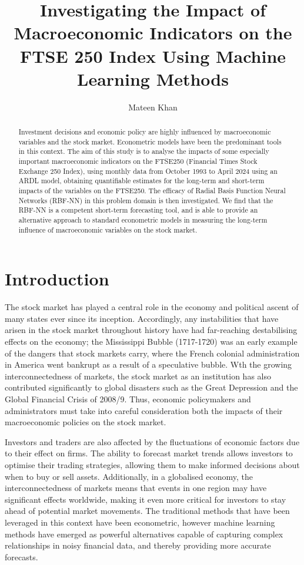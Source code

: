 \documentclass[12pt,a4paper]{article}
\title{Investigating the Impact of Macroeconomic Indicators 
on the FTSE 250 Index Using Machine Learning Methods}
\author{Mateen Khan}
\date{}
\begin{document}
\maketitle

\begin{abstract}
    Investment decisions and economic policy are highly influenced by 
    macroeconomic variables and the stock market. Econometric models
    have been the predominant tools in this context. The aim of this study is to analyse the impacts of some especially important macroeconomic
    indicators on the FTSE250 
    (Financial Times Stock Exchange 250 Index), using monthly data 
    from  October 1993 to April 2024 using an ARDL model, obtaining 
    quantifiable estimates for the long-term and short-term impacts of the variables
    on the FTSE250. The efficacy of Radial Basis Function 
    Neural Networks (RBF-NN) in this problem domain is then investigated. We find that 
    the RBF-NN is a competent short-term forecasting tool, and is able to 
    provide an alternative approach to standard econometric models in measuring the long-term influence of
    macroeconomic variables on the stock market.
\end{abstract}

\section{Introduction}

The stock market has played a central role in the economy and 
political ascent of many states ever since its inception. 
Accordingly, any instabilities that have arisen in the stock market 
throughout history have had far-reaching destabilising effects on the 
economy; the Mississippi Bubble (1717-1720) was an early example of the 
dangers that stock markets carry, where the French colonial administration 
in America went bankrupt as a result of a speculative bubble. Wth the
growing interconnectedness of markets, the stock market as an institution 
has also contributed significantly to global disasters such as the Great 
Depression and the Global Financial Crisis of 2008/9. Thus, economic 
policymakers and administrators must take into careful consideration 
both the impacts of their macroeconomic policies on the stock market.

Investors and traders are also affected by the 
fluctuations of economic factors due to their effect on firms.
The ability to forecast market trends allows 
investors to optimise their trading strategies, allowing them to make
informed decisions about when to buy or sell assets. 
Additionally, in a globalised economy, the interconnectedness of 
markets means that events in one region may have significant effects worldwide, 
making it even more critical for investors to stay ahead of potential market movements.
The traditional methods that have been leveraged in this context have been econometric, 
however machine learning methods have emerged as powerful alternatives capable
of capturing complex relationships in noisy financial data, and thereby providing more
accurate forecasts.
\end{document}
